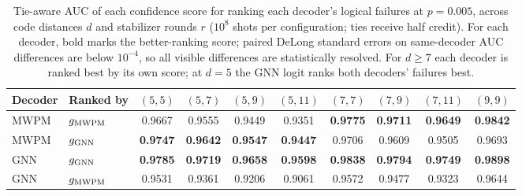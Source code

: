 \begin{table}
\centering
\begin{tabular}{ll| c c c c c c c c}
\toprule
Decoder & Ranked by & $(5, 5)$ & $(5, 7)$ & $(5, 9)$ & $(5, 11)$ & $(7, 7)$ & $(7, 9)$ & $(7, 11)$ & $(9, 9)$ \\
\hline
\midrule
MWPM & $g_{\rm MWPM}$ & 0.9667 & 0.9555 & 0.9449 & 0.9351 & \textbf{0.9775} & \textbf{0.9711} & \textbf{0.9649} & \textbf{0.9842} \\
MWPM & $g_{\rm GNN}$  & \textbf{0.9747} & \textbf{0.9642} & \textbf{0.9547} & \textbf{0.9447} & 0.9706 & 0.9609 & 0.9505 & 0.9693 \\
\hline
GNN  & $g_{\rm GNN}$  & \textbf{0.9785} & \textbf{0.9719} & \textbf{0.9658} & \textbf{0.9598} & \textbf{0.9838} & \textbf{0.9794} & \textbf{0.9749} & \textbf{0.9898} \\
GNN  & $g_{\rm MWPM}$ & 0.9531 & 0.9361 & 0.9206 & 0.9061 & 0.9572 & 0.9477 & 0.9323 & 0.9644 \\
\bottomrule
\end{tabular}
\caption{Tie-aware AUC of each confidence score for ranking each decoder's logical failures at $p = 0.005$, across code distances $d$ and stabilizer rounds $r$ ($10^8$ shots per configuration; ties receive half credit). For each decoder, bold marks the better-ranking score; paired DeLong standard errors on same-decoder AUC differences are below $10^{-4}$, so all visible differences are statistically resolved. For $d \geq 7$ each decoder is ranked best by its own score; at $d = 5$ the GNN logit ranks both decoders' failures best.}
\label{auc_table}
\end{table}
